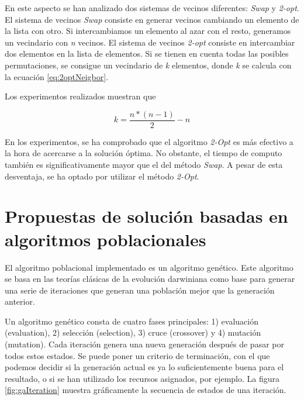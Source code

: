 \documentclass[10pt,a4paper]{article}
\begin{document}
En este aspecto se han analizado dos sistemas de vecinos diferentes: \textit{Swap} y \textit{2-opt}.
El sistema de vecinos \textit{Swap} consiste en generar vecinos cambiando un elemento de la lista con otro. Si intercambiamos un elemento al azar con el resto, generamos un vecindario con \textit{n} vecinos.
El sistema de vecinos \textit{2-opt} consiste en intercambiar dos elementos en la lista de elementos. Si se tienen en cuenta todas las posibles permutaciones, se consigue un vecindario de \textit{k} elementos, donde \textit{k} se calcula con la ecuación \ref{eq:2optNeigbor}.

Los experimentos realizados muestran que 

\begin{equation}
\label{eq:2optNeigbor}
k = \frac{n*(n-1)}{2}-n
\end{equation}

En los experimentos, se ha comprobado que el algoritmo \textit{2-Opt} es más efectivo a la hora de acercarse a la solución óptima. No obstante, el tiempo de computo también es significativamente mayor que el del método \textit{Swap}. A pesar de esta desventaja, se ha optado por utilizar el método \textit{2-Opt}.



\section{Propuestas de solución basadas en algoritmos poblacionales}
El algoritmo poblacional implementado es un algoritmo genético. Este algoritmo se basa en las teorías clásicas de la evolución darwiniana como base para generar una serie de iteraciones que generan una población mejor que la generación anterior.

Un algoritmo genético consta de cuatro fases principales: 1) evaluación (evaluation), 2) selección (selection), 3) cruce (crossover) y 4) mutación (mutation). Cada iteración genera una nueva generación después de pasar por todos estos estados. Se puede poner un criterio de terminación, con el que podemos decidir si la generación actual es ya lo suficientemente buena para el resultado, o si se han utilizado los recursos asignados, por ejemplo. La figura \ref{fig:gaIteration} muestra gráficamente la secuencia de estados de una iteración.
\end{document}
